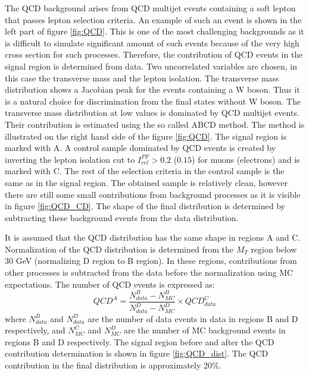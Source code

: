 The QCD background arises from QCD multijet events containing a soft lepton that passes lepton selection criteria. An example of such an event is shown in the left part of figure \ref{fig:QCD}. This is one of the most challenging backgrounds as it is difficult to simulate significant amount of such events because of the very high cross section for such processes. Therefore, the contribution of QCD events in the signal region is determined from data. Two uncorrelated variables are chosen, in this case the transverse mass and the lepton isolation. The transverse mass distribution shows a Jacobian peak for the events containing a W boson. Thus it is a natural choice for discrimination from the final states without W boson. The transverse mass distribution at low values is dominated by QCD multijet events. Their contribution is estimated using the so called ABCD method. The method is illustrated on the right hand side of the figure \ref{fig:QCD}. The signal region is marked with A. A control sample dominated by QCD events is created by inverting the lepton isolation cut to $I_{rel}^{PF}>0.2$ ($0.15$) for muons (electrons) and is marked with C. The rest of the selection criteria in the control sample is the same as in the signal region. The obtained sample is relatively clean, however there are still some small contributions from background processes as it is visible in figure \ref{fig:QCD_CD}. The shape of the final distribution is determined by subtracting these background events from the data distribution. 
\par It is assumed that the QCD distribution has the same shape in regions A and C. Normalization of the QCD distribution is determined from the $M_T$ region below 30 GeV (normalizing D region to B region). In these regions, contributions from other processes is subtracted from the data before the normalization using MC expectations. The number of QCD events is expressed as:
\begin{equation}
QCD^A=\frac{N^B_{data}-N^B_{MC}}{N^D_{data}-N^D_{MC}}\times QCD^{C}_{data}
\end{equation}       
where $N^B_{data}$ and $N^D_{data}$ are the number of data events in data in regions B and D respectively, and $N^C_{MC}$ and $N^D_{MC}$ are the number of MC background events in regions B and D respectively. The signal region before and after the QCD contribution determination is shown in figure \ref{fig:QCD_dist}. The QCD contribution in the final distribution is approximately 20$\%$.
